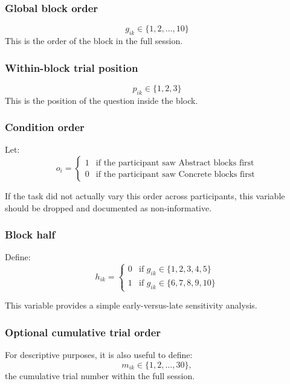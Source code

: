 \subsubsection{Global block order}
\begin{equation}
g_{ik} \in \{1,2,\dots,10\}
\end{equation}
This is the order of the block in the full session.

\subsubsection{Within-block trial position}
\begin{equation}
p_{ik} \in \{1,2,3\}
\end{equation}
This is the position of the question inside the block.

\subsubsection{Condition order}
Let:
\begin{equation}
o_i =
\begin{cases}
1 & \text{if the participant saw Abstract blocks first} \\
0 & \text{if the participant saw Concrete blocks first}
\end{cases}
\end{equation}

If the task did not actually vary this order across participants, this variable should be dropped
and documented as non-informative.

\subsubsection{Block half}
Define:
\begin{equation}
h_{ik} =
\begin{cases}
0 & \text{if } g_{ik} \in \{1,2,3,4,5\} \\
1 & \text{if } g_{ik} \in \{6,7,8,9,10\}
\end{cases}
\end{equation}

This variable provides a simple early-versus-late sensitivity analysis.

\subsubsection{Optional cumulative trial order}
For descriptive purposes, it is also useful to define:
\begin{equation}
m_{ik} \in \{1,2,\dots,30\},
\end{equation}
the cumulative trial number within the full session.

